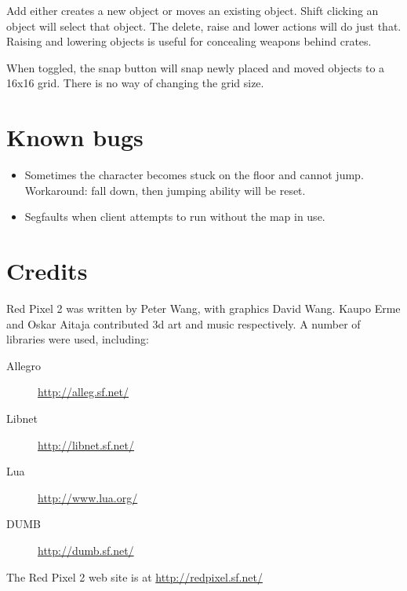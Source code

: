 \documentclass[a4paper]{article}
\begin{document}
\textsf{Add} either creates a new object or moves an existing object.
Shift clicking an object will select that object.  The
\textsf{delete}, \textsf{raise} and \textsf{lower} actions will do
just that.  Raising and lowering objects is useful for concealing
weapons behind crates.

When toggled, the \textsf{snap} button will snap newly placed and
moved objects to a 16x16 grid.  There is no way of changing the grid
size.



\section{Known bugs}

\begin{itemize}

\item Sometimes the character becomes stuck on the floor and cannot
  jump.  Workaround: fall down, then jumping ability will be reset.

\item Segfaults when client attempts to run without the map in use.

\end{itemize}



\section{Credits}

Red Pixel 2 was written by Peter Wang, with graphics David Wang.
Kaupo Erme and Oskar Aitaja contributed 3d art and music respectively.
A number of libraries were used, including:

\begin{description}
\item [Allegro] \url{http://alleg.sf.net/}
\item [Libnet] \url{http://libnet.sf.net/}
\item [Lua] \url{http://www.lua.org/}
\item [DUMB] \url{http://dumb.sf.net/}
\end{description}

\noindent
The Red Pixel 2 web site is at \url{http://redpixel.sf.net/}
\end{document}

